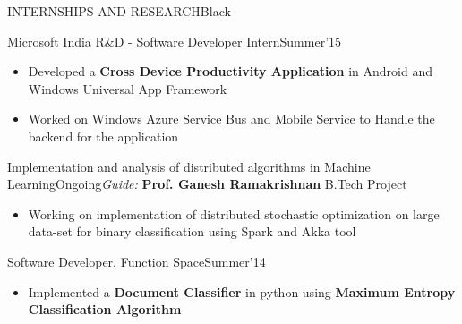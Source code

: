 \documentclass[11pt,a4paper]{article} %
\begin{document}
\iffalse
\begin{minipage}[t]{10cm}
\flushleft
\name{Anurag Shirolkar}{Black}\\
\vspace{2mm}
Computer Science \& Engineering\\
Indian Institute of Technology Bombay
\end{minipage}
\hfill
\begin{minipage}[t]{7cm}
\flushright
120050003\\
UG Third Year (B.Tech.)\\
CPI: 8.05\\
\href{mailto:ashirolkar47@gmail.com}{ashirolkar47@gmail.com}
\href{http://www.cse.iitb.ac.in/~anuragshirolkar}{www.cse.iitb.ac.in/\textasciitilde anuragshirolkar}
\end{minipage}
\fi

\vspace*{2.6cm}



\begin{ressection}{INTERNSHIPS AND RESEARCH}{Black}

\begin{ressubsectionold}{Microsoft India R\&D - Software Developer Intern}{Summer'15}{}
\begin{itemize}
\itemsep-0.3em
\item Developed a \textbf{Cross Device Productivity Application} in Android and Windows Universal App Framework
\item Worked on Windows Azure Service Bus and Mobile Service to Handle the backend for the application
\end{itemize}
\end{ressubsectionold}


\begin{ressubsectionold}{Implementation and analysis of distributed algorithms in Machine Learning}{Ongoing}{\textit{Guide:} \textbf{Prof. Ganesh Ramakrishnan} \hfill B.Tech Project}

\begin{itemize}
\itemsep-0.3em
\item Working on implementation of distributed stochastic optimization on large data-set for binary classification using Spark and Akka tool
\end{itemize}
\end{ressubsectionold}

\begin{ressubsectionold}{Software Developer, Function Space}{Summer'14}{}
\begin{itemize}
\itemsep-0.3em
\item Implemented a \textbf{Document Classifier} in python using \textbf{Maximum Entropy Classification Algorithm}
\end{itemize}
\end{ressubsectionold}


\end{ressection}
\end{document}
